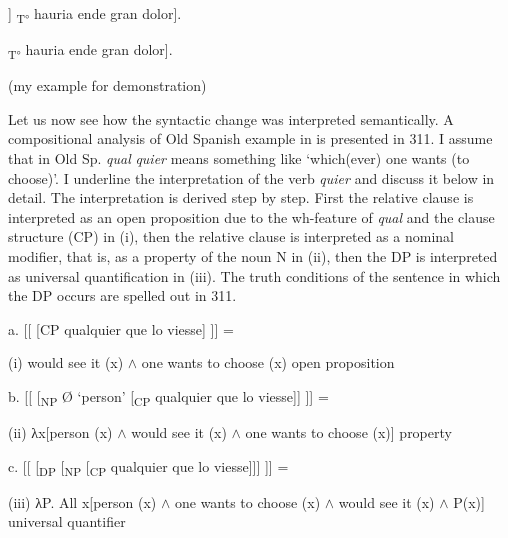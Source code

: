 \documentclass[output=paper]{langscibook}
\begin{document}
\begin{styleAuthor}
  [\textsubscript{TP} [\textsubscript{DP} [\textsubscript{CP} qual quier que lo viesse]] \textsubscript{T°} hauria ende gran dolor]. 
\end{styleAuthor}

\begin{styleAuthor}
  [\textsubscript{TP} [\textsubscript{DP} qualquier (NP)] \textsubscript{T°} hauria ende gran dolor]. 
\end{styleAuthor}

\begin{styleListParagraph}
\textmd{  (my example for demonstration)}
\end{styleListParagraph}

Let us now see how the syntactic change was interpreted semantically. A compositional analysis of Old Spanish example in  is presented in 311. I assume that in Old Sp. \textit{qual} \textit{quier} means something like ‘which(ever) one wants (to choose)’. I underline the interpretation of the verb \textit{quier} and discuss it below in detail. The interpretation is derived step by step. First the relative clause is interpreted as an open proposition due to the wh-feature of \textit{qual} and the clause structure (CP) in (i), then the relative clause is interpreted as a nominal modifier, that is, as a property of the noun N in (ii), then the DP is interpreted as universal quantification in (iii). The truth conditions of the sentence in which the DP occurs are spelled out in 311.

\begin{styleAuthor}
  a.  [[ [CP qualquier que lo viesse] ]] =   
\end{styleAuthor}

\begin{styleAuthor}
    (i) would see it (x) ${\wedge}$ one wants to choose (x)  open proposition
\end{styleAuthor}

  b.  [[ [\textsubscript{NP} Ø ‘person’ [\textsubscript{CP} qualquier que lo viesse]] ]] =  

    (ii) λx[person (x) ${\wedge}$ would see it (x) ${\wedge}$ one wants to choose (x)]  property

  c.  [[ [\textsubscript{DP} [\textsubscript{NP} [\textsubscript{CP} qualquier que lo viesse]]] ]] =  

    (iii) λP. All x[person (x) ${\wedge}$ one wants to choose (x) ${\wedge}$ would see it (x) ${\wedge}$ P(x)]  universal quantifier
\end{document}
